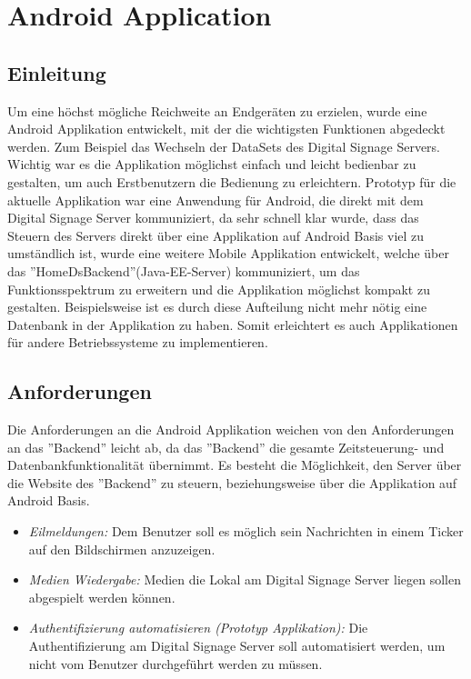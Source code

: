 \chapter{Android Application}
\section{Einleitung}
Um eine höchst mögliche Reichweite an Endgeräten zu erzielen, wurde eine Android Applikation entwickelt, mit der die wichtigsten Funktionen abgedeckt werden. Zum Beispiel das Wechseln der DataSets des Digital Signage Servers. Wichtig war es die Applikation möglichst einfach und leicht bedienbar zu gestalten, um auch Erstbenutzern die Bedienung zu erleichtern. 
Prototyp für die aktuelle Applikation war eine Anwendung für Android, die direkt mit dem Digital Signage Server kommuniziert, da sehr schnell klar wurde, dass das Steuern des Servers direkt über eine Applikation auf Android Basis viel zu umständlich ist, wurde eine weitere Mobile Applikation entwickelt, welche über das ''HomeDsBackend''(Java-EE-Server) kommuniziert, um das Funktionsspektrum zu erweitern und die Applikation möglichst kompakt zu gestalten. Beispielsweise ist es durch diese Aufteilung nicht mehr nötig eine Datenbank in der Applikation zu haben. Somit erleichtert es auch Applikationen für andere Betriebssysteme zu implementieren. 
\section{Anforderungen}
Die Anforderungen an die Android Applikation weichen von den Anforderungen an das ''Backend'' leicht ab, da das ''Backend'' die gesamte Zeitsteuerung- und Datenbankfunktionalität übernimmt. Es besteht die Möglichkeit, den Server über die Website des ''Backend'' zu steuern, beziehungsweise über die Applikation auf Android Basis. 
\begin{itemize}
	\item {\em Eilmeldungen:} Dem Benutzer soll es möglich sein Nachrichten in einem Ticker auf den Bildschirmen anzuzeigen.
	
	\item {\em Medien Wiedergabe:} Medien die Lokal am Digital Signage Server liegen sollen abgespielt werden können.
		
	\item {\em Authentifizierung automatisieren (Prototyp Applikation):} Die Authentifizierung am Digital Signage Server soll automatisiert werden, um nicht vom Benutzer durchgeführt werden zu müssen.  		
\end{itemize}
